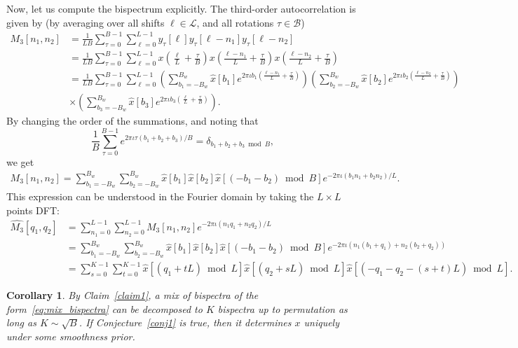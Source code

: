 \documentclass[english,12pt]{article}
\newtheorem{cor}{Corollary}
\newcommand{\I}{\iota}
\newcommand{\tB}{B_w}
\numberwithin{equation}{section}
\begin{document}
Now, let us  compute the bispectrum explicitly. The third-order autocorrelation is given by (by averaging over all shifts $\ell\in\mathcal{L}$, and all rotations $\tau\in\mathcal{B}$)
\begin{equation}
\begin{split}
M_3[n_1,n_2] &= \frac{1}{LB}\sum_{\tau=0}^{B-1}\sum_{\ell=0}^{L-1} y_\tau[\ell] y_\tau[\ell-n_1] y_\tau[\ell-n_2]\\ 
&= \frac{1}{LB}\sum_{\tau=0}^{B-1}\sum_{\ell=0}^{L-1} x\left(\frac{\ell}{L} + \frac{\tau}{B}\right) x\left(\frac{\ell-n_1}{L} + \frac{\tau}{B}\right)
x\left(\frac{\ell-n_2}{L} + \frac{\tau}{B}\right)\\
&= \frac{1}{LB}\sum_{\tau=0}^{B-1}\sum_{\ell=0}^{L-1} 
\left(\sum_{b_1=-\tB}^{\tB}\hat{x}[b_1]e^{2\pi\I b_1 \left(\frac{\ell-n_1}{L} + \frac{\tau}{B}\right) }\right) 
\left(\sum_{b_2=-\tB}^{\tB}\hat{x}[b_2]e^{2\pi\I b_2 \left(\frac{\ell-n_2}{L} + \frac{\tau}{B}\right) } \right) \\
&\times \left(\sum_{b_3=-\tB}^{\tB}\hat{x}[b_3]e^{2\pi\I b_3 \left(\frac{\ell}{L} + \frac{\tau}{B}\right) }\right). 
\end{split}
\end{equation}
By changing the order of the summations, and noting that 
\begin{equation} \label{eq:sum}
\frac{1}{B}\sum_{\tau=0}^{B-1}e^{2\pi\I\tau (b_1+b_2+b_3)/B} = \delta_{b_1+b_2+b_3\bmod B},
\end{equation}
we get 
\begin{equation}
\begin{split}
M_3[n_1,n_2] = 
\sum_{b_1=-\tB}^{\tB}\sum_{b_2=-\tB}^{\tB}\hat{x}[b_1]\hat{x}[b_2]\hat{x}[(-b_1-b_2)\bmod B]e^{-2\pi\I (b_1n_1 + b_2n_2)/L}.
\end{split}
\end{equation}
This expression can be understood in the Fourier domain by taking the $L\times L$ points DFT: 
\begin{equation} \label{eq:mix_bispectra}
\begin{split}
\hat{M_3}[q_1,q_2] &= \sum_{n_1=0}^{L-1} \sum_{n_2=0}^{L-1}
M_3[n_1,n_2]e^{-2\pi\I(n_1q_1+n_2q_2)/L} \\ &=  
\sum_{b_1=-\tB}^{\tB}\sum_{b_2=-\tB}^{\tB}\hat{x}[b_1]\hat{x}[b_2]\hat{x}[(-b_1-b_2)\bmod B]e^{-2\pi\I (n_1(b_1+q_1) + n_2(b_2+q_2))} \\ & = \sum_{s=0}^{K-1} \sum_{t=0}^{K-1} \hat{x}[(q_1 + tL)\bmod L] \hat{x}[(q_2 + sL)\bmod L]\hat{x}[(-q_1-q_2 - (s+t)L)\bmod L].
\end{split}
\end{equation}
\begin{cor}
	By Claim~\ref{claim1}, a mix of bispectra of the form~\eqref{eq:mix_bispectra} can be decomposed to $K$ bispectra up to permutation as long as $K\sim\sqrt{B}$. If Conjecture~\ref{conj1} is true, then it determines $x$ uniquely under some smoothness prior.  
\end{cor}
\end{document}
